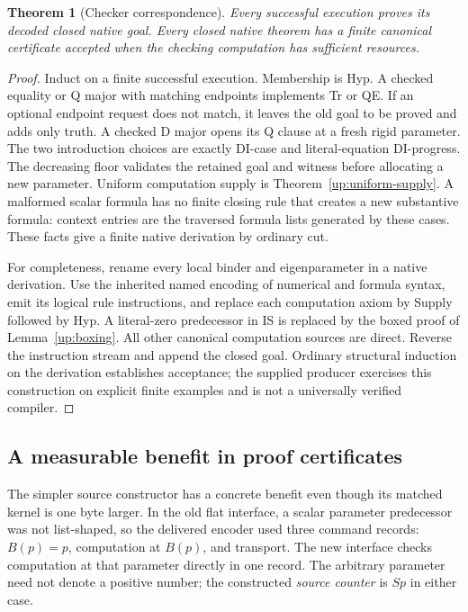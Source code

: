 \documentclass[11pt,letterpaper]{article}
\newtheorem{theorem}{Theorem}[section]
\theoremstyle{definition}\newtheorem{definition}[theorem]{Definition}
\theoremstyle{remark}\newtheorem{remark}[theorem]{Remark}
\begin{document}
\begin{theorem}[Checker correspondence]
Every successful execution proves its decoded closed native goal. Every
closed native theorem has a finite canonical certificate accepted when
the checking computation has sufficient resources.
\end{theorem}
\begin{proof}
Induct on a finite successful execution. Membership is Hyp. A checked
equality or Q major with matching endpoints implements Tr or QE. If an
optional endpoint request does not match, it leaves the old goal to be
proved and adds only truth. A checked D major opens its Q clause at a
fresh rigid parameter. The two introduction choices are exactly DI-case
and literal-equation DI-progress. The decreasing floor validates the
retained goal and witness before allocating a new parameter. Uniform
computation supply is Theorem~\ref{up:uniform-supply}. A malformed scalar
formula has no finite closing rule that creates a new substantive formula:
context entries are the traversed formula lists generated by these cases.
These facts give a finite native derivation by ordinary cut.

For completeness, rename every local binder and eigenparameter in a
native derivation. Use the inherited named encoding of numerical and
formula syntax, emit its logical rule instructions, and replace each
computation axiom by Supply followed by Hyp. A literal-zero predecessor
in IS is replaced by the boxed proof of Lemma~\ref{up:boxing}. All other
canonical computation sources are direct. Reverse the instruction stream
and append the closed goal. Ordinary structural induction on the derivation
establishes acceptance; the supplied producer exercises this construction
on explicit finite examples and is not a universally verified compiler.
\end{proof}

\subsection{A measurable benefit in proof certificates}

The simpler source constructor has a concrete benefit even though its
matched kernel is one byte larger. In the old flat interface, a scalar
parameter predecessor was not list-shaped, so the delivered encoder used
three command records: $B(p)=p$, computation at $B(p)$, and transport.
The new interface checks computation at that parameter directly in one
record. The arbitrary parameter need not denote a positive number; the
constructed \emph{source counter} is $Sp$ in either case.
\end{document}
